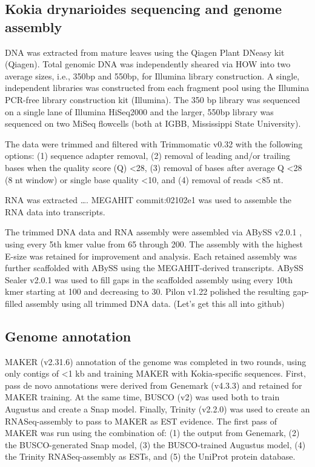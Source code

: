 \documentclass[10pt,letterpaper]{article}
\newcommand{\note}[2][]{\added[id=#1,remark={#2}]{}}
\begin{document}
\subsection*{Kokia drynarioides sequencing and genome assembly}

DNA was extracted from mature leaves using the Qiagen Plant DNeasy kit (Qiagen).
Total genomic DNA was independently sheared via HOW into two average sizes,
i.e., 350bp and 550bp, for Illumina library construction. A single, independent
libraries was constructed from each fragment pool using the Illumina PCR-free
library construction kit (Illumina). The 350 bp library was sequenced on a
single lane of Illumina HiSeq2000 and the larger, 550bp library was sequenced on
two MiSeq flowcells (both at IGBB, Mississippi State University).

The data were trimmed and filtered with Trimmomatic v0.32 \cite{Bolger2014} with
the following options: (1) sequence adapter removal, (2) removal of leading
and/or trailing bases when the quality score (Q) \textless 28, (3) removal of
bases after average Q \textless 28 (8 nt window) or single base quality
\textless 10, and (4) removal of reads \textless 85 nt.

RNA was extracted \ldots. MEGAHIT commit:02102e1 \cite{Li2015} was used to assemble
the RNA data into transcripts.

The trimmed DNA data and RNA assembly were assembled via ABySS v2.0.1
\cite{Simpson2009}, using every 5th kmer value from 65 through 200. The assembly
with the highest E-size \cite{Salzberg2012} was retained for improvement and
analysis. Each retained assembly was further scaffolded with ABySS using the
MEGAHIT-derived transcripts. ABySS Sealer v2.0.1 \cite{Paulino2015} was used to
fill gaps in the scaffolded assembly using every 10th kmer starting at 100 and
decreasing to 30. Pilon v1.22 \cite{Walker2014} polished the resulting
gap-filled assembly using all trimmed DNA data. (Let's get this all into github)


\subsection*{Genome annotation}

MAKER (v2.31.6)\cite{Holt2011} annotation of the genome was completed in two
rounds, using only contigs of \textless 1 kb and training MAKER with
Kokia-specific sequences. First, pass de novo annotations were derived from
Genemark (v4.3.3)\cite{Lomsadze2005} and retained for MAKER training. At the
same time, BUSCO (v2)\cite{Simao2015} was used both to train Augustus and create
a Snap model\note[Corrinne]{WHAT'S A SNAP MODEL}. Finally, Trinity
\note[Corrinne]{WHY TRINITY VS MEGAHIT} (v2.2.0)\cite{Grabherr2011} was used to
create an RNASeq-assembly to pass to MAKER as EST evidence. The first pass of
MAKER was run using the combination of: (1) the output from Genemark, (2) the
BUSCO-generated Snap model, (3) the BUSCO-trained Augustus\cite{Stanke2003}
model, (4) the Trinity RNASeq-assembly as ESTs, and (5) the UniProt protein
database.
\end{document}
